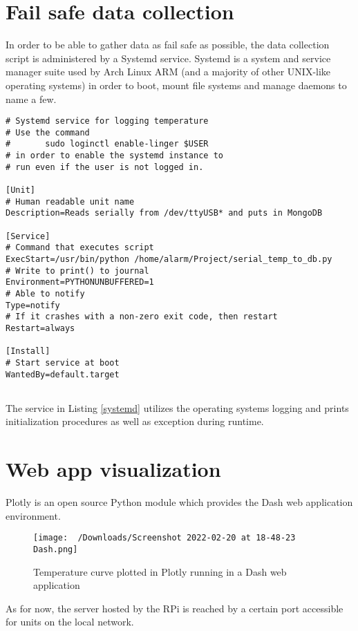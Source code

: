 \documentclass[10pt]{article}
\begin{document}
\section*{Fail safe data collection}%
\label{sec:fail_safe_data_collection}
In order to be able to gather data as fail safe as possible, the data collection script is administered by a Systemd service. Systemd is a system and service manager suite used by Arch Linux ARM (and a majority of other UNIX-like operating systems) in order to boot, mount file systems and manage daemons to name a few.

\begin{lstlisting}[caption={The systemd service that manages data collection}, label={systemd}]
 # Systemd service for logging temperature
# Use the command
#       sudo loginctl enable-linger $USER
# in order to enable the systemd instance to
# run even if the user is not logged in.

[Unit]
# Human readable unit name
Description=Reads serially from /dev/ttyUSB* and puts in MongoDB

[Service]
# Command that executes script
ExecStart=/usr/bin/python /home/alarm/Project/serial_temp_to_db.py
# Write to print() to journal
Environment=PYTHONUNBUFFERED=1
# Able to notify
Type=notify
# If it crashes with a non-zero exit code, then restart
Restart=always

[Install]
# Start service at boot
WantedBy=default.target
 
\end{lstlisting}

The service in Listing \ref{systemd} utilizes the operating systems logging and prints initialization procedures as well as exception during runtime.

\section*{Web app visualization}%
Plotly is an open source Python module which provides the Dash web application environment.
\label{sec:design}
\begin{figure}[ht]
  \centering
  \texttt{[image: ~/Downloads/Screenshot 2022-02-20 at 18-48-23 Dash.png]}
  \caption{Temperature curve plotted in Plotly running in a Dash web application}%
  \label{fig:dash}
\end{figure}

As for now, the server hosted by the RPi is reached by a certain port accessible for units on the local network.  
\end{document}
